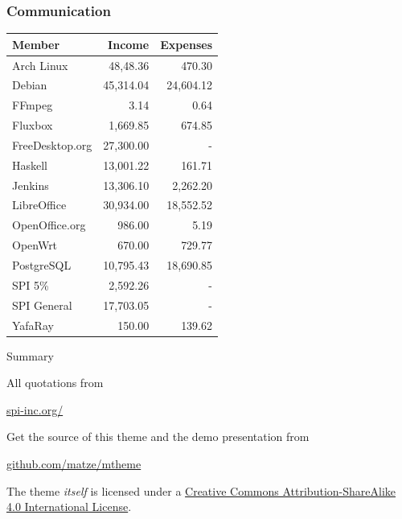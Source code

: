 \documentclass[10pt, compress]{beamer}
\begin{document}
\begin{frame}[fragile]
  \frametitle{Communication}
  \begin{center}
    \begin{table}
      \begin{tabular}{lrr}
        \toprule
        Member & Income & Expenses\\
        \midrule
Arch Linux & 48,48.36 & 470.30\\
Debian & 45,314.04 & 24,604.12\\
FFmpeg & 3.14 & 0.64\\
Fluxbox & 1,669.85 & 674.85\\
FreeDesktop.org & 27,300.00 & -\\
Haskell & 13,001.22 & 161.71\\
Jenkins & 13,306.10 & 2,262.20\\
LibreOffice & 30,934.00 & 18,552.52\\
OpenOffice.org & 986.00 & 5.19\\
OpenWrt & 670.00 & 729.77\\
PostgreSQL & 10,795.43 & 18,690.85\\
SPI 5\% & 2,592.26 & -\\
SPI General & 17,703.05 & -\\
YafaRay & 150.00 & 139.62\\
        \bottomrule
      \end{tabular}
    \end{table}
  \end{center}
\end{frame}




\begin{frame}{Summary}

  All quotations from
  
  \begin{center}\url{spi-inc.org/}\end{center}

  Get the source of this theme and the demo presentation from

  \begin{center}\url{github.com/matze/mtheme}\end{center}

  The theme \emph{itself} is licensed under a
  \href{http://creativecommons.org/licenses/by-sa/4.0/}{Creative Commons
  Attribution-ShareAlike 4.0 International License}.

  \begin{center}\ccbysa\end{center}

\end{frame}


\end{document}
